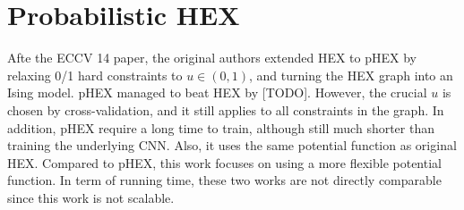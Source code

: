 \documentclass[11pt,a4paper]{article}
\begin{document}
\section{Probabilistic HEX}

Afte the ECCV 14 paper, the original authors extended HEX to pHEX by relaxing 0/1 hard constraints to $u\in(0,1)$, and turning the HEX graph into an Ising model. pHEX managed to beat HEX by [TODO]. However, the crucial $u$ is chosen by cross-validation, and it still applies to all constraints in the graph. In addition, pHEX require a long time to train, although still much shorter than training the underlying CNN. Also, it uses the same potential function as original HEX. Compared to pHEX, this work focuses on using a more flexible potential function. In term of running time, these two works are not directly comparable since this work is not scalable.

\clearpage


\end{document}
